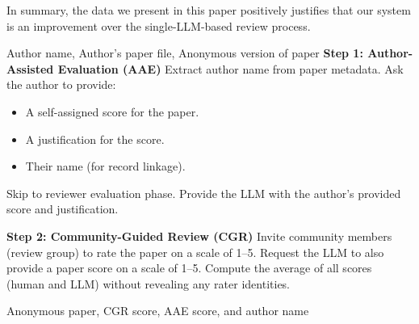 \documentclass{article} %
\begin{document}
In summary, the data we present in this paper positively justifies that our system is an improvement over the single-LLM-based review process.

\begin{algorithm}[htb]
    \caption{Author-Assisted Evaluation (AAE) and Community-Guided Review (CGR) of a Paper}
    \label{alg:total}
    \begin{algorithmic}[1]
        \REQUIRE Author name, Author's paper file, Anonymous version of paper
        \STATE \textbf{Step 1: Author-Assisted Evaluation (AAE)}
        \STATE Extract author name from paper metadata.
        \STATE Ask the author to provide:
        \begin{itemize}
            \item A self-assigned score for the paper.
            \item A justification for the score.
            \item Their name (for record linkage).
        \end{itemize}
            \STATE Skip to reviewer evaluation phase.
        \ELSE
            \STATE Provide the LLM with the author’s provided score and justification.
        \ENDIF

        \STATE \textbf{Step 2: Community-Guided Review (CGR)}
        \STATE Invite community members (review group) to rate the paper on a scale of 1–5.
        \STATE Request the LLM to also provide a paper score on a scale of 1–5.
        \STATE Compute the average of all scores (human and LLM) without revealing any rater identities.

        \ENSURE Anonymous paper, CGR score, AAE score, and author name
    \end{algorithmic}
\end{algorithm}
\end{document}
